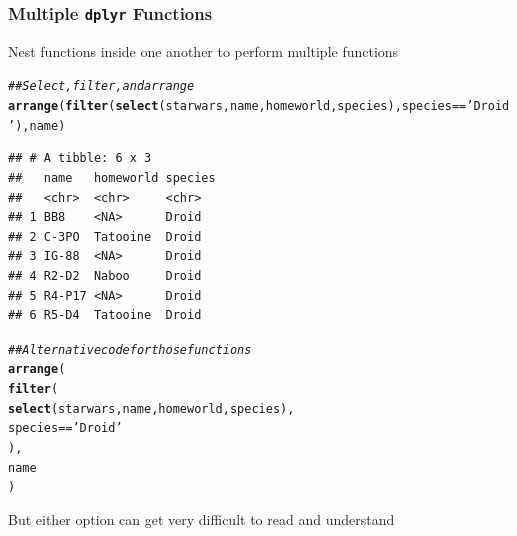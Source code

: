 \documentclass{beamer}\usepackage[]{graphicx}\usepackage[]{xcolor}
\makeatletter
\newcommand{\hlstr}[1]{\textcolor[rgb]{0.192,0.494,0.8}{#1}}%
\newcommand{\hlcom}[1]{\textcolor[rgb]{0.678,0.584,0.686}{\textit{#1}}}%
\newcommand{\hlopt}[1]{\textcolor[rgb]{0,0,0}{#1}}%
\newcommand{\hlstd}[1]{\textcolor[rgb]{0.345,0.345,0.345}{#1}}%
\newcommand{\hlkwd}[1]{\textcolor[rgb]{0.737,0.353,0.396}{\textbf{#1}}}%
\newenvironment{kframe}{%
 \def\at@end@of@kframe{}%
 \ifinner\ifhmode%
  \def\at@end@of@kframe{\end{minipage}}%
  \begin{minipage}{\columnwidth}%
 \fi\fi%
 \def\FrameCommand##1{\hskip\@totalleftmargin \hskip-\fboxsep
 \colorbox{shadecolor}{##1}\hskip-\fboxsep
     \hskip-\linewidth \hskip-\@totalleftmargin \hskip\columnwidth}%
 \MakeFramed {\advance\hsize-\width
   \@totalleftmargin\z@ \linewidth\hsize
   \@setminipage}}%
 {\par\unskip\endMakeFramed%
 \at@end@of@kframe}
\newenvironment{knitrout}{}{} %
\makeatother
\begin{document}
\begin{frame}[fragile]\frametitle{Multiple \texttt{dplyr} Functions}
    Nest functions inside one another to perform multiple functions
\begin{knitrout}\footnotesize
{}\color{fgcolor}\begin{kframe}
\begin{alltt}
\hlcom{## Select, filter, and arrange}
\hlkwd{arrange}\hlstd{(}\hlkwd{filter}\hlstd{(}\hlkwd{select}\hlstd{(starwars, name, homeworld, species), species} \hlopt{==} \hlstr{'Droid'}\hlstd{), name)}
\end{alltt}
\begin{verbatim}
## # A tibble: 6 x 3
##   name   homeworld species
##   <chr>  <chr>     <chr>  
## 1 BB8    <NA>      Droid  
## 2 C-3PO  Tatooine  Droid  
## 3 IG-88  <NA>      Droid  
## 4 R2-D2  Naboo     Droid  
## 5 R4-P17 <NA>      Droid  
## 6 R5-D4  Tatooine  Droid
\end{verbatim}
\end{kframe}
\end{knitrout}
\begin{knitrout}\footnotesize
{}\color{fgcolor}\begin{kframe}
\begin{alltt}
\hlcom{## Alternative code for those functions}
\hlkwd{arrange}\hlstd{(}
  \hlkwd{filter}\hlstd{(}
    \hlkwd{select}\hlstd{(starwars, name, homeworld, species),}
    \hlstd{species} \hlopt{==} \hlstr{'Droid'}
  \hlstd{),}
  \hlstd{name}
\hlstd{)}
\end{alltt}
\end{kframe}
\end{knitrout}
    But either option can get very difficult to read and understand
\end{frame}
\end{document}
